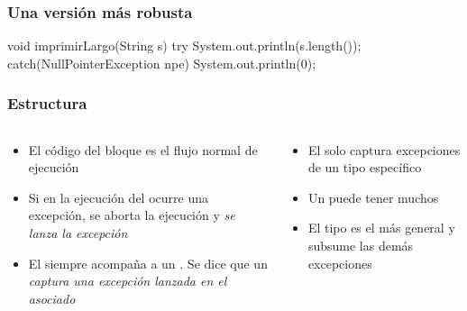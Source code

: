 \documentclass{beamer}
\begin{document}
\begin{frame}[fragile]
  \frametitle{Una versión más robusta}

\begin{jsmall}
void imprimirLargo(String s) {
    try {
      System.out.println(s.length());
    } catch(NullPointerException npe) {
      System.out.println(0);
    }
}
\end{jsmall}

  
\end{frame}

\begin{frame}[fragile]
  \frametitle{Estructura }
  \begin{columns}
    \begin{column}{0.5\textwidth}
      \begin{footnotesize}
      \begin{itemize}
        
      \item El código del bloque  es el flujo normal
        de ejecución
        
      \item Si en la ejecución del  ocurre una excepción, se
        aborta la ejecución y \emph{se lanza la excepción}
        
      \item El  siempre acompaña a un . Se dice
        que un  \emph{captura una excepción lanzada en el
           asociado}       
      \end{itemize}
      \end{footnotesize}
    \end{column}
    \begin{column}{0.5\textwidth}
      \begin{footnotesize}
      \begin{itemize}    
      \item El  solo captura excepciones de un tipo
        específico
        
      \item Un  puede tener muchos 
        
      \item El tipo  es el más general y subsume las
        demás excepciones        
      \end{itemize}
      \end{footnotesize}     
    \end{column}
  \end{columns}
  
\end{frame}
\end{document}
